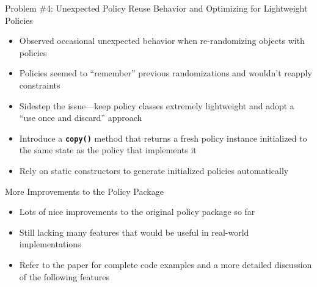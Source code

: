 \documentclass[aspectratio=169]{beamer}
\newcommand{\code}[1]{
  \textbf{\texttt{#1}}
}
\begin{document}
\begin{frame}{\LARGE{Problem \#4: Unexpected Policy Reuse Behavior and Optimizing for Lightweight Policies}}
  \begin{itemize}
    \item Observed occasional unexpected behavior when re-randomizing objects with policies
    \item Policies seemed to ``remember'' previous randomizations and wouldn't reapply constraints
    \item Sidestep the issue---keep policy classes extremely lightweight and adopt a ``use once and discard'' approach
    \item Introduce a \code{copy()} method that returns a fresh policy instance initialized to the same state as the policy that implements it
    \item Rely on static constructors to generate initialized policies automatically
  \end{itemize}
\end{frame}

\begin{frame}
\end{frame}

\begin{frame}{More Improvements to the Policy Package}
  \begin{itemize}
    \item Lots of nice improvements to the original policy package so far
    \vspace{8pt}
    \item Still lacking many features that would be useful in real-world implementations
    \vspace{8pt}
    \item Refer to the paper for complete code examples and a more detailed discussion of the following features
  \end{itemize}
\end{frame}
\end{document}
